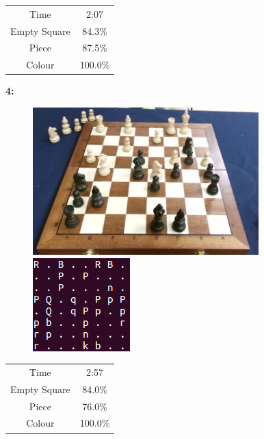 \documentclass{l4proj}
\begin{document}
\begin{appendices}
\begin{figure}[h!]
\label{ts5}
\end{figure}

\begin{table}[h!]
\centering
\begin{tabular}{|c|c|}
	\hline
	Time & 2:07 \\
	\rowcolor{brown!45}Empty Square & 84.3\%  \\
	Piece & 87.5\% \\
	\rowcolor{brown!45} Colour & 100.0\% \\
	\hline
\end{tabular}
\end{table}

\textbf{4:}
\begin{figure}[h!]
\includegraphics[scale=0.8]{ts/ts7.png} \includegraphics[scale=0.75]{ts/tsd7.png}
\label{ts7}
\end{figure}

\begin{table}[h!]
\centering
\begin{tabular}{|c|c|}
	\hline
	Time & 2:57 \\
	\rowcolor{brown!45}Empty Square & 84.0\%  \\
	Piece & 76.0\% \\
	\rowcolor{brown!45} Colour & 100.0\% \\
	\hline
\end{tabular}
\end{table}



\end{appendices}
\end{document}
